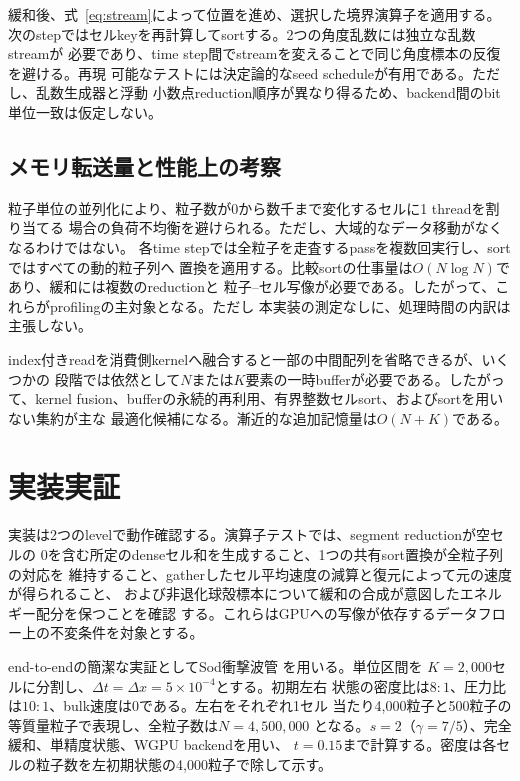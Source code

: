 \documentclass[a4paper,11pt]{ltjsarticle}
\begin{document}
緩和後、式~\eqref{eq:stream}によって位置を進め、選択した境界演算子を適用する。
次のstepではセルkeyを再計算してsortする。2つの角度乱数には独立な乱数streamが
必要であり、time step間でstreamを変えることで同じ角度標本の反復を避ける。再現
可能なテストには決定論的なseed scheduleが有用である。ただし、乱数生成器と浮動
小数点reduction順序が異なり得るため、backend間のbit単位一致は仮定しない。

\subsection{メモリ転送量と性能上の考察}

粒子単位の並列化により、粒子数が0から数千まで変化するセルに1 threadを割り当てる
場合の負荷不均衡を避けられる。ただし、大域的なデータ移動がなくなるわけではない。
各time stepでは全粒子を走査するpassを複数回実行し、sortではすべての動的粒子列へ
置換を適用する。比較sortの仕事量は$O(N\log N)$であり、緩和には複数のreductionと
粒子--セル写像が必要である。したがって、これらがprofilingの主対象となる。ただし
本実装の測定なしに、処理時間の内訳は主張しない。

index付きreadを消費側kernelへ融合すると一部の中間配列を省略できるが、いくつかの
段階では依然として$N$または$K$要素の一時bufferが必要である。したがって、kernel
fusion、bufferの永続的再利用、有界整数セルsort、およびsortを用いない集約が主な
最適化候補になる。漸近的な追加記憶量は$O(N+K)$である。

\section{実装実証}

実装は2つのlevelで動作確認する。演算子テストでは、segment reductionが空セルの
0を含む所定のdenseセル和を生成すること、1つの共有sort置換が全粒子列の対応を
維持すること、gatherしたセル平均速度の減算と復元によって元の速度が得られること、
および非退化球殻標本について緩和の合成が意図したエネルギー配分を保つことを確認
する。これらはGPUへの写像が依存するデータフロー上の不変条件を対象とする。

end-to-endの簡潔な実証としてSod衝撃波管 \cite{sod1978}を用いる。単位区間を
$K=2{,}000$セルに分割し、$\Delta t=\Delta x=5\times10^{-4}$とする。初期左右
状態の密度比は$8:1$、圧力比は$10:1$、bulk速度は0である。左右をそれぞれ1セル
当たり4,000粒子と500粒子の等質量粒子で表現し、全粒子数は$N=4{,}500{,}000$
となる。$s=2$（$\gamma=7/5$）、完全緩和、単精度状態、WGPU backendを用い、
$t=0.15$まで計算する。密度は各セルの粒子数を左初期状態の4,000粒子で除して示す。
\end{document}
